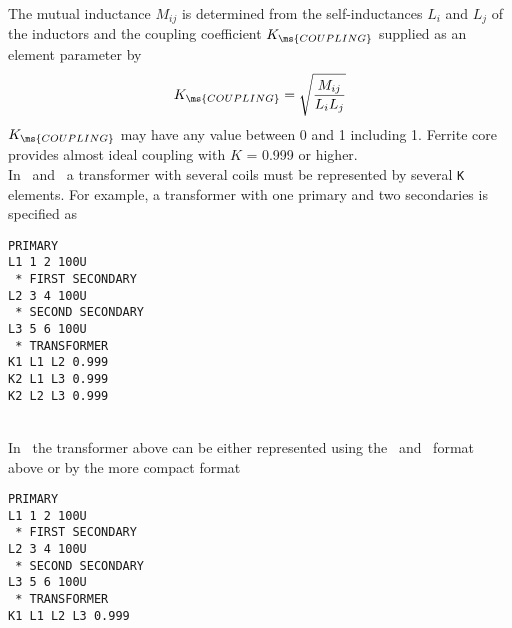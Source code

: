 The mutual inductance $M_{ij}$ is determined from the
self-inductances $L_i$ and $L_j$ of the inductors and the coupling
coefficient $K_{\ms{COUPLING}}$ supplied as an element parameter
by
\begin{equation}
      K_{\ms{COUPLING}} = \sqrt{{{\textstyle M_{ij}} \over{\textstyle L_iL_j}}}
\end{equation}
$K_{\ms{COUPLING}}$ may have any value between 0 and 1 including
1. Ferrite core provides almost ideal coupling with $K$ = 0.999 or
higher.\\
In \spicetwo\ and \spicethree\ a transformer with several coils
must be represented by several {\tt K} elements. For example, a
transformer with one primary and two secondaries is specified as\\

\offset
      \parbox{2.5in}{
      \tt  * PRIMARY\\
           L1 1 2 100U\\
    \  * FIRST SECONDARY\\
       L2 3 4 100U\\
    \  * SECOND SECONDARY\\
       L3 5 6 100U\\
    \  * TRANSFORMER\\
       K1 L1 L2 0.999\\
       K2 L1 L3 0.999\\
       K2 L2 L3 0.999}\\

In \pspice\ the transformer above can be either represented using
the \spicetwo\ and \spicethree\ format above or by the more
compact format\\

\offset
      \parbox{2.5in}{
      \tt  * PRIMARY\\
           L1 1 2 100U\\
    \  * FIRST SECONDARY\\
       L2 3 4 100U\\
    \  * SECOND SECONDARY\\
       L3 5 6 100U\\
    \  * TRANSFORMER\\
       K1 L1 L2 L3 0.999}
\newline

\label{COREmodelpspice} \marginid{}  


